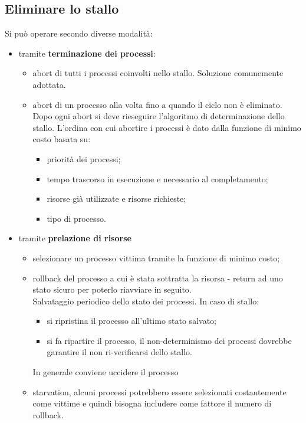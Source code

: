 \documentclass[12pt, letterpaper]{report}
\begin{document}
	\subsection{Eliminare lo stallo}
	Si può operare secondo diverse modalità:
	\begin{itemize}
		\item tramite \textbf{terminazione dei processi}:
		\begin{itemize}
			\item abort di tutti i processi coinvolti nello stallo. Soluzione comunemente adottata.
			\item abort di un processo alla volta fino a quando il ciclo non è eliminato. Dopo ogni abort si deve rieseguire l'algoritmo di determinazione dello stallo. L'ordina con cui abortire i processi è dato dalla funzione di minimo costo basata su:
			\begin{itemize}
				\item priorità dei processi;
				\item tempo trascorso in esecuzione e necessario al completamento;
				\item risorse già utilizzate e risorse richieste;
				\item tipo di processo.
			\end{itemize}
		\end{itemize}
		\item tramite \textbf{prelazione di risorse}
		\begin{itemize}
			\item selezionare un processo vittima tramite la funzione di minimo costo;
			\item rollback del processo a cui è stata sottratta la risorsa - return ad uno stato sicuro per poterlo riavviare in seguito. \\
			Salvataggio periodico dello stato dei processi. In caso di stallo:
			\begin{itemize}
				\item si ripristina il processo all'ultimo stato salvato;
				\item si fa ripartire il processo, il non-determinismo dei processi dovrebbe garantire il non ri-verificarsi dello stallo.
			\end{itemize}
			In generale conviene uccidere il processo
			\item starvation, alcuni processi potrebbero essere selezionati costantemente come vittime e quindi bisogna includere come fattore il numero di rollback.
		\end{itemize}
	\end{itemize}
\end{document}
